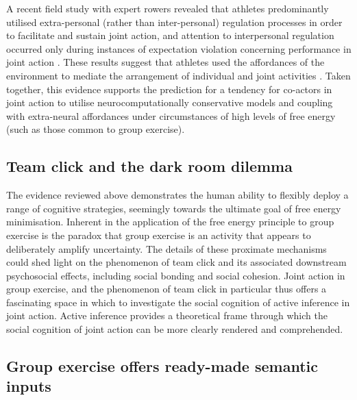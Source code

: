 \begin{CJK}{UTF8}{gbsn}
A recent field study with expert rowers revealed that athletes predominantly utilised
extra-personal (rather than inter-personal) regulation processes in order to facilitate and sustain joint action, and attention to interpersonal regulation occurred only during instances of expectation violation concerning performance in joint action \citep[; for a full explanation of this study, see Appendix ~\ref{app2:theory} Section ~\ref{sect:rowerStudy}]{RKiouak2016}. These results suggest that athletes used the affordances of the environment to mediate the arrangement of individual and joint activities \citep{Bourbousson2011,Bourbousson2012}.  Taken together, this evidence supports the prediction for a tendency for co-actors in joint action to utilise neurocomputationally conservative models and coupling with extra-neural affordances under circumstances of high levels of free energy (such as those common to group exercise).


\subsection{Team click and the dark room dilemma}
The evidence reviewed above demonstrates the human ability to flexibly deploy a range of cognitive strategies, seemingly towards the ultimate goal of free energy minimisation.  Inherent in the application of the free energy principle to group exercise is the paradox that group exercise is an activity that appears to deliberately amplify uncertainty.
The details of these proximate mechanisms could shed light on the phenomenon of team click and its associated downstream psychosocial effects, including social bonding and social cohesion.  Joint action in group exercise, and the phenomenon of team click in particular thus offers a fascinating space in which to investigate the social cognition of active inference in joint action.  Active inference provides a theoretical frame through which the social cognition of joint action can be more clearly rendered and comprehended.




\subsection{Group exercise offers ready-made semantic inputs}




\end{CJK}
